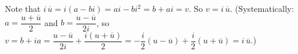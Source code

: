 Note that $i\,\overline u=i(a-bi)=ai-bi^2=b+ai=v$. So $\boxed{v=i\,\overline u}$. (Systematically: $a=\dfrac{u+\overline u}{2}$ and $b=\dfrac{u-\overline u}{2i}$, so $v=b+ia=\dfrac{u-\overline u}{2i}+\dfrac{i\left(u+\overline u\right)}{2}=-\dfrac i2\left(u-\overline u\right)+\dfrac i2\left(u+\overline u\right)=i\,\overline u$.)
